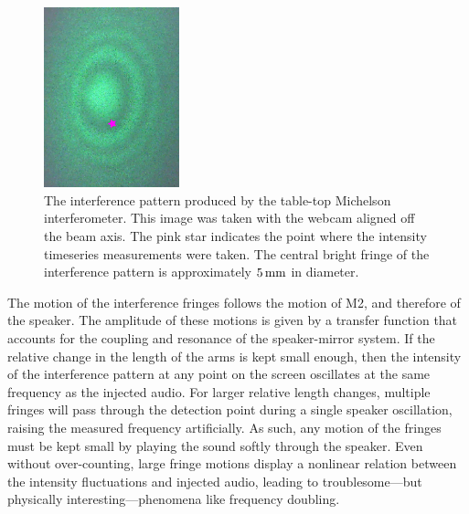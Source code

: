 \documentclass[paper-main.tex]{subfiles}
\begin{document}
\begin{figure}
 \begin{center}
  \includegraphics[width=0.35\textwidth, angle=-90]{figures/webcam_still0_star.pdf}
 \end{center}
 \caption{\label{fig:interference_pattern}
The interference pattern produced by the table-top Michelson interferometer.
This image was taken with the webcam aligned off the beam axis. 
The pink star indicates the point where the intensity timeseries measurements were taken.
The central bright fringe of the interference pattern is approximately $5\,{\rm mm}$ in diameter. 
}
\end{figure}


The motion of the interference fringes follows the motion of M2, and therefore of the speaker.
The amplitude of these motions is given by a transfer function that accounts for the coupling and resonance of the speaker-mirror system.
If the relative change in the length of the arms is kept small enough, then the intensity of the interference pattern at any point on the screen oscillates at the same frequency as the injected audio.
For larger relative length changes, multiple fringes will pass through the detection point during a single speaker oscillation, raising the measured frequency artificially. 
As such, any motion of the fringes must be kept small by playing the sound softly through the speaker.
Even without over-counting, large fringe motions display a nonlinear relation between the intensity fluctuations and injected audio, leading to troublesome---but physically interesting---phenomena like frequency doubling.
\end{document}
